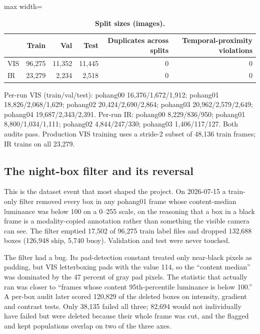 \documentclass[10pt]{article}
\begin{document}
\begin{table}[htbp]
\centering
\footnotesize
\caption{\textbf{Split sizes (images).}}
\label{tab:4}
\begin{adjustbox}{max width=\linewidth}
\begin{tabular}{lrrrrr}
\toprule
 & Train & Val & Test & Duplicates across splits & Temporal-proximity violations \\
\midrule
VIS & 96,275 & 11,352 & 11,445 & 0 & 0 \\
IR & 23,279 & 2,234 & 2,518 & 0 & 0 \\
\bottomrule
\end{tabular}
\end{adjustbox}
\end{table}
Per-run VIS (train/val/test): pohang00 16,376/1,672/1,912; pohang01 18,826/2,068/1,629; pohang02 20,424/2,690/2,864; pohang03 20,962/2,579/2,649; pohang04 19,687/2,343/2,391. Per-run IR: pohang00 8,229/836/950; pohang01 8,800/1,034/1,111; pohang02 4,844/247/330; pohang03 1,406/117/127. Both audits pass. Production VIS training uses a stride-2 subset of 48,136 train frames; IR trains on all 23,279.

\subsection{The night-box filter and its reversal}\label{app:A.4}
This is the dataset event that most shaped the project. On 2026-07-15 a train-only filter removed every box in any pohang01 frame whose content-median luminance was below 100 on a 0--255 scale, on the reasoning that a box in a black frame is a modality-copied annotation rather than something the visible camera can see. The filter emptied 17,502 of 96,275 train label files and dropped 132,688 boxes (126,948 ship, 5,740 buoy). Validation and test were never touched.

The filter had a bug. Its pad-detection constant treated only near-black pixels as padding, but VIS letterboxing pads with the value 114, so the ``content median'' was dominated by the 47 percent of gray pad pixels. The statistic that actually ran was closer to ``frames whose content 95th-percentile luminance is below 100.'' A per-box audit later scored 120,829 of the deleted boxes on intensity, gradient and contrast tests. Only 38,135 failed all three; 82,694 would not individually have failed but were deleted because their whole frame was cut, and the flagged and kept populations overlap on two of the three axes.
\end{document}
